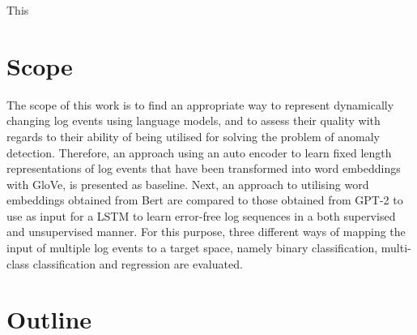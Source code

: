This 





\section{Scope\label{sec:scope}}
The scope of this work is to find an appropriate way to represent dynamically changing log events using language models, and to assess their quality with regards to their ability of being utilised for solving the problem of anomaly detection. Therefore, an approach using an auto encoder to learn fixed length representations of log events that have been transformed into word embeddings with GloVe, is presented as baseline. Next, an approach to utilising word embeddings obtained from Bert are compared to those obtained from GPT-2 to use as input for a LSTM to  learn error-free log sequences in a both supervised and unsupervised manner. For this purpose, three different ways of mapping the input of multiple log events to a target space, namely binary classification, multi-class classification and regression are evaluated.


\section{Outline\label{sec:outline}}

